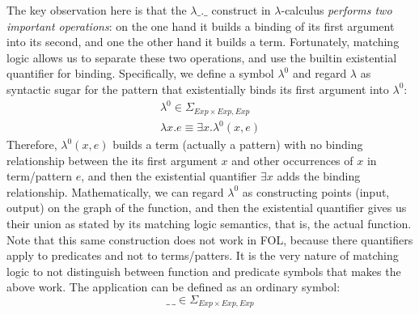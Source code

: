 \documentclass[UTF8,11pt]{article}
\theoremstyle{plain}
\theoremstyle{definition}
\theoremstyle{remark}
\newcommand{\Exp}{\textit{Exp}}
\begin{document}
The key observation here is that the $\lambda\_.\_$ construct in
$\lambda$-calculus \emph{performs two important operations}: on the one hand
it builds a binding of its first argument into its second, and one the other
hand it builds a term.
Fortunately, matching logic allows us to separate these two operations, and
use the builtin existential quantifier for binding.
Specifically, we define a symbol $\lambda^0$ and regard $\lambda$ as syntactic
sugar for the pattern that existentially binds its first argument into $\lambda^0$:
$$
\begin{array}{l}
\lambda^0 \in \Sigma_{\Exp\times\Exp,\Exp} \\
\lambda x . e \equiv \exists x . \lambda^0(x,e)
\end{array}
$$
Therefore, $\lambda^0(x,e)$ builds a term (actually a pattern) with no binding
relationship between the its first argument $x$ and other occurrences of $x$ in
term/pattern $e$, and then the existential quantifier $\exists x$ adds the binding
relationship.
Mathematically, we can regard $\lambda^0$ as constructing points (input, output)
on the graph of the function, and then the existential quantifier gives us their
union as stated by its matching logic semantics, that is, the actual function.
Note that this same construction does not work in FOL, because there quantifiers
apply to predicates and not to terms/patters.
It is the very nature of matching logic to not distinguish between function
and predicate symbols that makes the above work.
The application can be defined as an ordinary symbol:
$$
\_\,\_ \in \Sigma_{\Exp \times \Exp,\Exp}
$$
\end{document}
